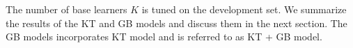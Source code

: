 \documentclass{article}
\begin{document}
\begin{spacing}{0.9}
\begin{itemize}
\end{itemize}

The number of base learners $K$ is tuned on the development set.
We summarize the results of the KT and GB models and discuss them in the next section.
The GB models incorporates KT model and is referred to as KT + GB model.

%

%


\end{spacing}
\end{document}
